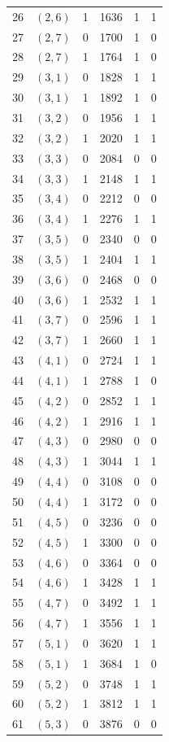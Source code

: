 {\begin{longtable}{@{}rrrrrr@{}}
26 & $(2,6)$ & 1 & 1636 & 1 & 1\\
27 & $(2,7)$ & 0 & 1700 & 1 & 0\\
28 & $(2,7)$ & 1 & 1764 & 1 & 0\\
29 & $(3,1)$ & 0 & 1828 & 1 & 1\\
30 & $(3,1)$ & 1 & 1892 & 1 & 0\\
31 & $(3,2)$ & 0 & 1956 & 1 & 1\\
32 & $(3,2)$ & 1 & 2020 & 1 & 1\\
33 & $(3,3)$ & 0 & 2084 & 0 & 0\\
34 & $(3,3)$ & 1 & 2148 & 1 & 1\\
35 & $(3,4)$ & 0 & 2212 & 0 & 0\\
36 & $(3,4)$ & 1 & 2276 & 1 & 1\\
37 & $(3,5)$ & 0 & 2340 & 0 & 0\\
38 & $(3,5)$ & 1 & 2404 & 1 & 1\\
39 & $(3,6)$ & 0 & 2468 & 0 & 0\\
40 & $(3,6)$ & 1 & 2532 & 1 & 1\\
41 & $(3,7)$ & 0 & 2596 & 1 & 1\\
42 & $(3,7)$ & 1 & 2660 & 1 & 1\\
43 & $(4,1)$ & 0 & 2724 & 1 & 1\\
44 & $(4,1)$ & 1 & 2788 & 1 & 0\\
45 & $(4,2)$ & 0 & 2852 & 1 & 1\\
46 & $(4,2)$ & 1 & 2916 & 1 & 1\\
47 & $(4,3)$ & 0 & 2980 & 0 & 0\\
48 & $(4,3)$ & 1 & 3044 & 1 & 1\\
49 & $(4,4)$ & 0 & 3108 & 0 & 0\\
50 & $(4,4)$ & 1 & 3172 & 0 & 0\\
51 & $(4,5)$ & 0 & 3236 & 0 & 0\\
52 & $(4,5)$ & 1 & 3300 & 0 & 0\\
53 & $(4,6)$ & 0 & 3364 & 0 & 0\\
54 & $(4,6)$ & 1 & 3428 & 1 & 1\\
55 & $(4,7)$ & 0 & 3492 & 1 & 1\\
56 & $(4,7)$ & 1 & 3556 & 1 & 1\\
57 & $(5,1)$ & 0 & 3620 & 1 & 1\\
58 & $(5,1)$ & 1 & 3684 & 1 & 0\\
59 & $(5,2)$ & 0 & 3748 & 1 & 1\\
60 & $(5,2)$ & 1 & 3812 & 1 & 1\\
61 & $(5,3)$ & 0 & 3876 & 0 & 0\\

\end{longtable}}
